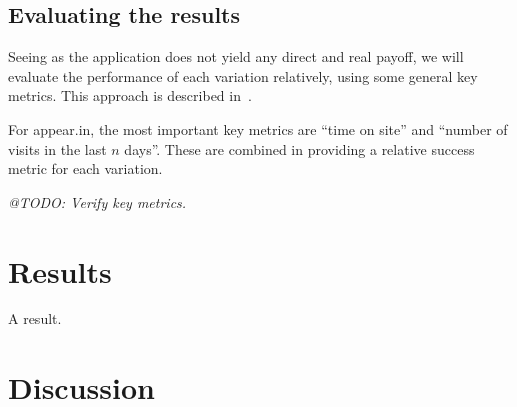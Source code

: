 \subsection{Evaluating the results} %
\label{eval:sec:evaluating_the_results}

Seeing as the application does not yield any direct and real payoff, we will evaluate the performance of each variation relatively, using some general key metrics. This approach is described in~\cite{Yue2012}.

For appear.in, the most important key metrics are ``time on site'' and ``number of visits in the last $n$ days''. These are combined in providing a relative success metric for each variation.

\emph{@TODO: Verify key metrics.}




\section{Results} %
\label{eval:sec:results}

\begin{table}
  
  \caption{A result.}
  \label{tab:results}
\end{table}


\section{Discussion} %
\label{eval:sec:discussion}

